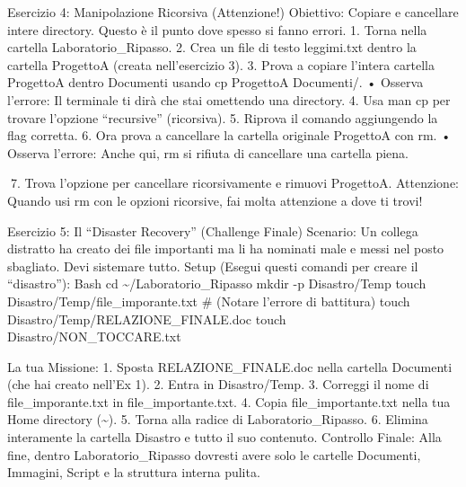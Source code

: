 \documentclass[11pt,a4paper]{article}
\begin{document}
Esercizio 4: Manipolazione Ricorsiva (Attenzione!) Obiettivo: Copiare e
cancellare intere directory. Questo è il punto dove spesso si fanno
errori. 1. Torna nella cartella Laboratorio\_Ripasso. 2. Crea un file di
testo leggimi.txt dentro la cartella ProgettoA (creata nell'esercizio
3). 3. Prova a copiare l'intera cartella ProgettoA dentro Documenti
usando cp ProgettoA Documenti/. • Osserva l'errore: Il terminale ti dirà
che stai omettendo una directory. 4. Usa man cp per trovare l'opzione
``recursive'' (ricorsiva). 5. Riprova il comando aggiungendo la flag
corretta. 6. Ora prova a cancellare la cartella originale ProgettoA con
rm. • Osserva l'errore: Anche qui, rm si rifiuta di cancellare una
cartella piena.

7. Trova l'opzione per cancellare ricorsivamente e rimuovi ProgettoA.
Attenzione: Quando usi rm con le opzioni ricorsive, fai molta attenzione
a dove ti trovi!

Esercizio 5: Il ``Disaster Recovery'' (Challenge Finale) Scenario: Un
collega distratto ha creato dei file importanti ma li ha nominati male e
messi nel posto sbagliato. Devi sistemare tutto. Setup (Esegui questi
comandi per creare il ``disastro''): Bash cd
\textasciitilde/Laboratorio\_Ripasso mkdir -p Disastro/Temp touch
Disastro/Temp/file\_imporante.txt \# (Notare l'errore di battitura)
touch Disastro/Temp/RELAZIONE\_FINALE.doc touch
Disastro/NON\_TOCCARE.txt

La tua Missione: 1. Sposta RELAZIONE\_FINALE.doc nella cartella
Documenti (che hai creato nell'Ex 1). 2. Entra in Disastro/Temp. 3.
Correggi il nome di file\_imporante.txt in file\_importante.txt. 4.
Copia file\_importante.txt nella tua Home directory (\textasciitilde).
5. Torna alla radice di Laboratorio\_Ripasso. 6. Elimina interamente la
cartella Disastro e tutto il suo contenuto. Controllo Finale: Alla fine,
dentro Laboratorio\_Ripasso dovresti avere solo le cartelle Documenti,
Immagini, Script e la struttura interna pulita.


\end{document}
